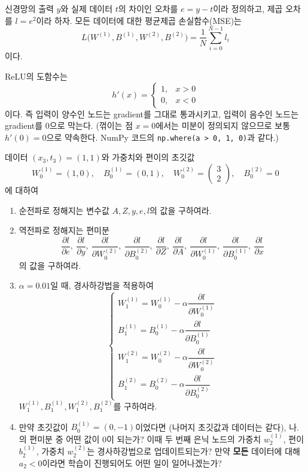 \documentclass[11pt,a4paper]{article}
\begin{document}
신경망의 출력 $y$와 실제 데이터 $t$의 차이인 오차를 $e=y-t$이라 정의하고, 제곱 오차를 $l=e^2$이라 하자.
모든 데이터에 대한 평균제곱 손실함수(MSE)는
\[
L\bigl(W^{(1)},B^{(1)},W^{(2)},B^{(2)}\bigr)=\frac1N\sum_{i=0}^{N-1}l_i
\]
이다.

\begin{remarkbox}
ReLU의 도함수는
\[
h'(x)=\begin{cases}1,&x>0\\0,&x<0\end{cases}
\]
이다. 즉 입력이 양수인 노드는 gradient를 그대로 통과시키고,
입력이 음수인 노드는 gradient를 $0$으로 막는다.
(꺾이는 점 $x=0$에서는 미분이 정의되지 않으므로 보통 $h'(0)=0$으로 약속한다.
NumPy 코드의 \texttt{np.where(a > 0, 1, 0)}과 같다.)
\end{remarkbox}

데이터 $(x_3,t_3)=(1,1)$와 가중치와 편이의 초깃값
\[
W^{(1)}_0=(1,0),\quad
B^{(1)}_0=(0,1),\quad
W^{(2)}_0=
\begin{pmatrix}
3\\ 2
\end{pmatrix},\quad
B^{(2)}_0=0
\]
에 대하여

\begin{enumerate}[leftmargin=2.2em]
\item[가.] 순전파로 정해지는 변수값 $A,Z,y,e,l$의 값을 구하여라.
\item[나.] 역전파로 정해지는 편미분
\[
\frac{\partial l}{\partial e},\
\frac{\partial l}{\partial y},\
\frac{\partial l}{\partial W^{(2)}_0},\
\frac{\partial l}{\partial B^{(2)}_0},\
\frac{\partial l}{\partial Z},\
\frac{\partial l}{\partial A},\
\frac{\partial l}{\partial W^{(1)}_0},\
\frac{\partial l}{\partial B^{(1)}_0},\
\frac{\partial l}{\partial x}
\]
의 값을 구하여라.
\item[다.] $\alpha=0.01$일 때, 경사하강법을 적용하여
\[
\begin{cases}
W^{(1)}_1=W^{(1)}_0-\alpha\dfrac{\partial l}{\partial W^{(1)}_0}\\[10pt]
B^{(1)}_1=B^{(1)}_0-\alpha\dfrac{\partial l}{\partial B^{(1)}_0}\\[10pt]
W^{(2)}_1=W^{(2)}_0-\alpha\dfrac{\partial l}{\partial W^{(2)}_0}\\[10pt]
B^{(2)}_1=B^{(2)}_0-\alpha\dfrac{\partial l}{\partial B^{(2)}_0}
\end{cases}
\]
$W^{(1)}_1,B^{(1)}_1,W^{(2)}_1,B^{(2)}_1$를 구하여라.
\item[라.] 만약 초깃값이 $B^{(1)}_0=(0,-1)$이었다면 (나머지 초깃값과 데이터는 같다),
나.의 편미분 중 어떤 값이 $0$이 되는가?
이때 두 번째 은닉 노드의 가중치 $w^{(1)}_2$, 편이 $b^{(1)}_2$, 가중치 $w^{(2)}_2$는
경사하강법으로 업데이트되는가?
만약 \textbf{모든} 데이터에 대해 $a_2<0$이라면 학습이 진행되어도 어떤 일이 일어나겠는가?
\end{enumerate}
\end{document}
